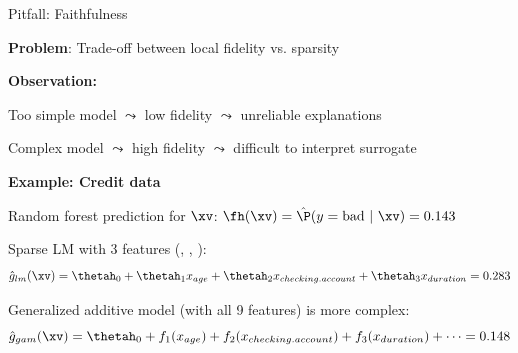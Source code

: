 \documentclass[10pt,compress,t,notes=noshow, xcolor=table]{beamer}
\newcommand{\gh}{\hat{g}}
\begin{document}
\begin{framev}[align=top]{Pitfall: Faithfulness}
\begin{itemizeM}
\item \textbf{Problem}: Trade-off between local fidelity vs. sparsity
\item \textbf{Observation:}
\begin{itemizeS}
\item Too simple model $\leadsto$ low fidelity $\leadsto$ unreliable explanations
\item Complex model $\leadsto$ high fidelity $\leadsto$ difficult to interpret surrogate %
\end{itemizeS}
\pause
\item \textbf{Example: Credit data}
\begin{itemizeS}
\item Random forest prediction for $\xv$:
$\fh(\xv) = \hat{\P}(y = \text{bad} ~|~ \xv) = 0.143$
\item %
Sparse LM with 3 features (, , ):
$$\gh_{lm}(\xv) = \thetah_0 + \thetah_1 x_{age} + \thetah_2 x_{checking.account} + \thetah_3 x_{duration} = 0.283$$
\item Generalized additive model (with all 9 features) is more complex:
$$\gh_{gam}(\xv) = \thetah_0 + f_1(x_{age}) + f_2(x_{checking.account}) + f_3(x_{duration}) + \dots = 0.148$$
\end{itemizeS}
\end{itemizeM}
\end{framev}
\end{document}
